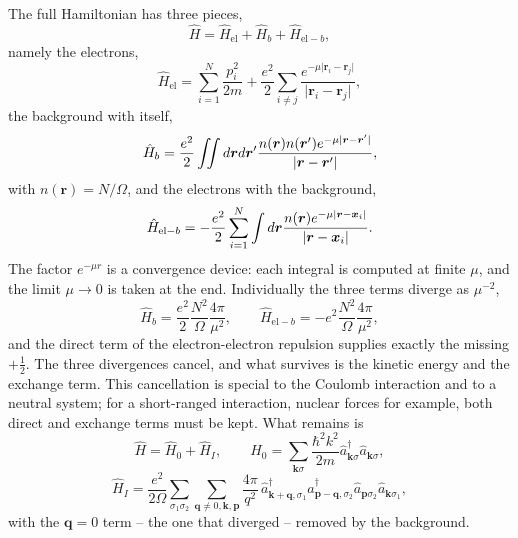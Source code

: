 The full Hamiltonian has three pieces,
\begin{equation}
  \hat{H} = \hat{H}_{\mathrm{el}} + \hat{H}_{b} + \hat{H}_{\mathrm{el}-b},
  \label{eq:6-threepieces}
\end{equation}
namely the electrons,
\begin{equation}
  \hat{H}_{\mathrm{el}} = \sum_{i=1}^{N}\frac{p_i^2}{2m}
    + \frac{e^2}{2}\sum_{i\ne j}
      \frac{e^{-\mu\vert\bm{r}_i-\bm{r}_j\vert}}
           {\vert\bm{r}_i-\bm{r}_j\vert},
  \label{eq:6-Hel}
\end{equation}
the background with itself,
\begin{equation}
  \hat{H}_{b} = \frac{e^2}{2}\iint d\bm{r}d\bm{r}'
    \frac{n(\bm{r})n(\bm{r}')e^{-\mu\vert\bm{r}-\bm{r}'\vert}}
         {\vert\bm{r}-\bm{r}'\vert},
  \label{eq:6-Hb}
\end{equation}
with $n(\bm{r})=N/\Omega$, and the electrons with the background,
\begin{equation}
  \hat{H}_{\mathrm{el}-b} = -\frac{e^2}{2}\sum_{i=1}^{N}\int d\bm{r}
    \frac{n(\bm{r})e^{-\mu\vert\bm{r}-\bm{x}_i\vert}}
         {\vert\bm{r}-\bm{x}_i\vert}.
  \label{eq:6-Helb}
\end{equation}
The factor $e^{-\mu r}$ is a convergence device: each integral is computed at
finite $\mu$, and the limit $\mu\to0$ is taken at the end.  Individually the
three terms diverge as $\mu^{-2}$,
\begin{equation}
  \hat{H}_{b} = \frac{e^2}{2}\frac{N^2}{\Omega}\frac{4\pi}{\mu^2},
  \qquad
  \hat{H}_{\mathrm{el}-b} = -e^2\frac{N^2}{\Omega}\frac{4\pi}{\mu^2},
  \label{eq:6-divergences}
\end{equation}
and the direct term of the electron-electron repulsion supplies exactly the
missing $+\tfrac12$.  The three divergences cancel, and what survives is the
kinetic energy and the exchange term.  This cancellation is special to the
Coulomb interaction and to a neutral system; for a short-ranged interaction,
nuclear forces for example, both direct and exchange terms must be kept.  What
remains is
\begin{equation}
  \hat{H} = \hat{H}_0 + \hat{H}_I,
  \qquad
  \hat{H}_0 = \sum_{\bm{k}\sigma}\frac{\hbar^2k^2}{2m}
    \hat{a}^{\dagger}_{\bm{k}\sigma}\hat{a}_{\bm{k}\sigma},
  \label{eq:6-egH0}
\end{equation}
\begin{equation}
  \hat{H}_I = \frac{e^2}{2\Omega}\sum_{\sigma_1\sigma_2}
    \sum_{\bm{q}\ne0,\bm{k},\bm{p}}\frac{4\pi}{q^2}\,
    \hat{a}^{\dagger}_{\bm{k}+\bm{q},\sigma_1}
    \hat{a}^{\dagger}_{\bm{p}-\bm{q},\sigma_2}
    \hat{a}_{\bm{p}\sigma_2}\hat{a}_{\bm{k}\sigma_1},
  \label{eq:6-egHI}
\end{equation}
with the $\bm{q}=0$ term -- the one that diverged -- removed by the
background.

